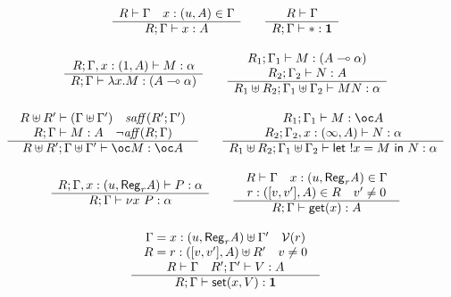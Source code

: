 \documentclass[11pt]{article}
\newcommand{\Gives}{\vdash}             \newcommand{\IGives}{\vdash_{I}}        \newcommand{\AIGives}{\vdash_{{\it AI}}} \newcommand{\CGives}{\vdash_{C}}
\newcommand{\hyp}[3]{#1:(#2, #3)}
\newcommand{\letm}[3]{{\sf let} \ ! #1 = #2 \ {\sf in} \ #3}    \newcommand{\tertype}{{\bf 1}}
\newcommand{\csum}{\uplus}              \newcommand{\dpar}{\mid\!\mid}
\newcommand{\infer}[2]{\begin{array}{c} #1 \\ \hline #2 \end{array}}
\newcommand{\st}[2]{{\sf set}(#1,#2)}
\newcommand{\rgtype}[2]{{\it {\sf Reg}_{#1} #2}}
\newcommand{\get}[1]{{\sf get}(#1)}
\newcommand{\new}[2]{\nu #1 \ #2}
\newcommand{\upair}[2]{[#1,#2]}
\newcommand{\vlt}[1]{{\cal V}(#1)}
\begin{document}
\begin{table}
{\footnotesize
\[
\begin{array}{c}

\infer{R\Gives \Gamma\quad \hyp{x}{u}{A}\in \Gamma}
{R;\Gamma \Gives x:A}

\qquad

\infer{R\Gives \Gamma}
{R;\Gamma \Gives *:\tertype} \\ \\ 


\infer{R;\Gamma,\hyp{x}{1}{A} \Gives M:\alpha}
{R;\Gamma \Gives \lambda x.M:(A \limp \alpha)}

\qquad

\infer{
\begin{array}{c}
R_1;\Gamma_1\Gives M:(A\limp \alpha)\\
R_2;\Gamma_2\Gives N:A
\end{array}}
{R_1\csum R_2;\Gamma_1\csum \Gamma_2 \Gives MN:\alpha} \\ \\ 

\infer{
\begin{array}{c}
R\csum R'\Gives (\Gamma\csum \Gamma') \quad \w{saff}(R';\Gamma')\\
R;\Gamma \Gives M:A \quad \neg \w{aff}(R;\Gamma) 
\end{array}
}
{R\csum R';\Gamma \csum \Gamma' \Gives \bang M:\bang A}

\qquad

\infer{\begin{array}{c}
R_1;\Gamma_1\Gives M:\bang A\\ 
R_2;\Gamma_2,\hyp{x}{\infty}{A} \Gives N:\alpha
\end{array}}
{R_1\csum R_2;\Gamma_1\csum \Gamma_2 \Gives \letm{x}{M}{N}:\alpha} \\ \\ 


\infer{R;\Gamma,\hyp{x}{u}{\rgtype{r}{A}} \Gives P:\alpha}
{R;\Gamma \Gives \new{x}{P}:\alpha}

\qquad
\infer{\begin{array}{c}
R\Gives \Gamma \quad \hyp{x}{u}{\rgtype{r}{A}}\in \Gamma  \\
\hyp{r}{\upair{v}{v'}}{A} \in R \quad v' \neq 0 
\end{array}}
{R;\Gamma \Gives \get{x}:A} \\ \\

\infer{\begin{array}{c}
\Gamma= \hyp{x}{u}{\rgtype{r}{A}} \csum \Gamma' \quad \vlt{r}\\
R = \hyp{r}{\upair{v}{v'}}{A} \csum R' \quad v \neq 0 \\
R\Gives \Gamma\quad R';\Gamma'\Gives V:A
\end{array}}
{R;\Gamma \Gives \st{x}{V}:\tertype} 


\end{array}\]}
\end{table}
\end{document}
